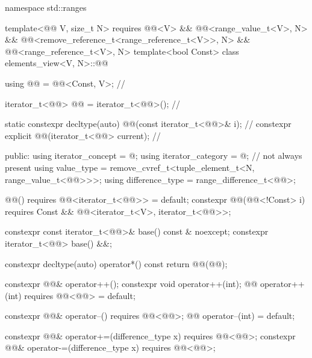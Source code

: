 %
\begin{codeblock}
namespace std::ranges {
  template<@@ V, size_t N>
    requires @@<V> && @@<range_value_t<V>, N> &&
             @@<remove_reference_t<range_reference_t<V>>, N> &&
             @@<range_reference_t<V>, N>
  template<bool Const>
  class elements_view<V, N>::@@ {
    using @@ = @@<Const, V>;                 // \expos

    iterator_t<@@> @@ = iterator_t<@@>();     // \expos

    static constexpr decltype(auto) @@(const iterator_t<@@>& i);     // \expos
    constexpr explicit @@(iterator_t<@@> current);                      // \expos

  public:
    using iterator_concept = @\seebelow@;
    using iterator_category = @\seebelow@;                // not always present
    using value_type = remove_cvref_t<tuple_element_t<N, range_value_t<@@>>>;
    using difference_type = range_difference_t<@@>;

    @@() requires @@<iterator_t<@@>> = default;
    constexpr @@(@@<!Const> i)
      requires Const && @@<iterator_t<V>, iterator_t<@@>>;

    constexpr const iterator_t<@@>& base() const & noexcept;
    constexpr iterator_t<@@> base() &&;

    constexpr decltype(auto) operator*() const
    { return @@(@@); }

    constexpr @@& operator++();
    constexpr void operator++(int);
    @@ operator++(int) requires @@<@@> = default;

    constexpr @@& operator--() requires @@<@@>;
    @@ operator--(int) = default;

    constexpr @@& operator+=(difference_type x)
      requires @@<@@>;
    constexpr @@& operator-=(difference_type x)
      requires @@<@@>;

}}
\end{codeblock}
